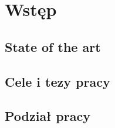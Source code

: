 \chapter{Wstęp}
\section{State of the art}
\section{Cele i tezy pracy}
\section{Podział pracy}










